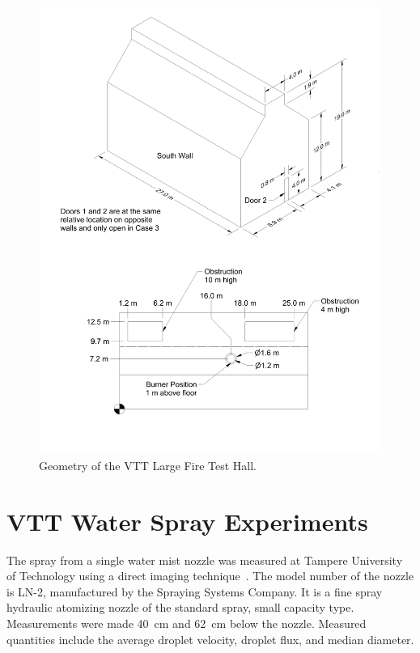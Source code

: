 \begin{figure}[p]
\includegraphics[width=\textwidth]{FIGURES/VTT/VTT_Drawing}
\caption[Geometry of the VTT Large Fire Test Hall]{Geometry of the VTT Large Fire Test Hall.}
\label{VTT_Drawing}
\end{figure}


\section{VTT Water Spray Experiments}

The spray from a single water mist nozzle was measured at Tampere University of Technology using a direct imaging technique~\cite{Vaari:2012}. The model number of the nozzle is LN-2, manufactured by the Spraying Systems Company. It is a fine spray hydraulic atomizing nozzle of the standard spray, small capacity type. Measurements were made 40~cm and 62~cm below the nozzle. Measured quantities include the average droplet velocity, droplet flux, and median diameter.


